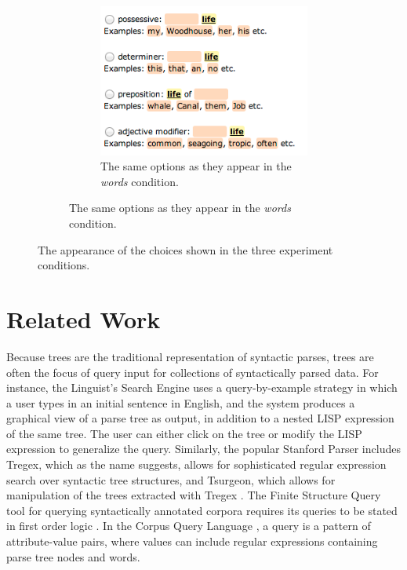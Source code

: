 \begin{figure}[th]
\begin{subfigure}{0.7\columnwidth}
	    \begin{subfigure}{0.7\columnwidth}
	    	\centering
	    	\includegraphics[width=0.9\columnwidth]{fig/words-choices}
	        \caption {The same options as they appear in the \emph{words} condition. \label{fig:words-choices}}
	    \end{subfigure}
	\end{subfigure}
\caption{\label{fig:choices} The appearance of the choices shown in the three experiment conditions.}
\end{figure}

\section{Related Work}

Because trees are the traditional representation of  syntactic parses, trees are often the focus of query input for collections of syntactically parsed data.   For instance, the Linguist's Search Engine \cite{resnik2005web} uses a query-by-example strategy in which a user types in an initial sentence in English, and the system produces a graphical view of a parse tree as output, in addition to a nested LISP expression of the same tree.  The user can either click on the tree or modify the LISP expression to generalize the query.    Similarly, the popular Stanford Parser includes Tregex, which as the name suggests,  allows for sophisticated regular expression search over syntactic tree structures, and Tsurgeon, which allows for manipulation of the trees extracted with Tregex \cite{levy2006tregex}.  
The Finite Structure Query tool for querying syntactically annotated corpora requires its queries to be stated in first order logic \cite{kepser2003finite}. In the Corpus Query Language \cite{jakubicek2010fast}, a query is a pattern of attribute-value pairs, where values can include regular expressions containing parse tree nodes and words.

